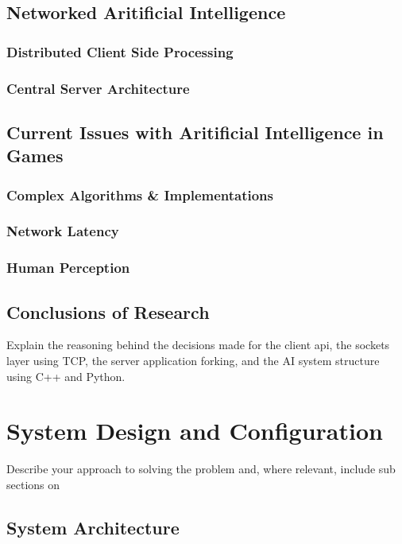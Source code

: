 \documentclass[12pt,a4paper,titlepage]{article}
\begin{document}
\subsection{Networked Aritificial Intelligence}

\subsubsection{Distributed Client Side Processing}

\subsubsection{Central Server Architecture}

\subsection{Current Issues with Aritificial Intelligence in Games}

\subsubsection{Complex Algorithms \& Implementations}

\subsubsection{Network Latency}

\subsubsection{Human Perception}

\subsection{Conclusions of Research}

Explain the reasoning behind the decisions made for the client api, the sockets layer using TCP, the server application forking, and the AI system structure using C++ and Python.

\section{System Design and Configuration}
Describe your approach to solving the problem and, where relevant, include sub sections on

\subsection{System Architecture}
\end{document}
